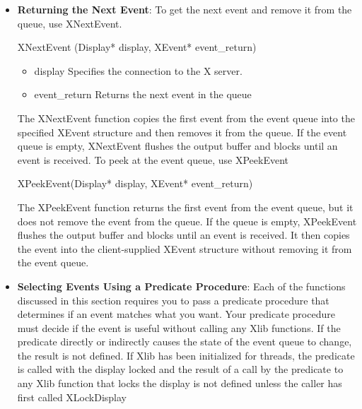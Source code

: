 \documentclass{report}
\begin{document}
\begin{itemize}
\begin{cppcode}
{                    XKeyEvent           xkey;
                    XButtonEvent        xbutton;
                    XMotionEvent        xmotion;
                    XExposeEvent        xexpose;
                    XConfigureEvent     xconfigure;
                    XMapEvent           xmap;
                    XMapRequestEvent    xmaprequest;
                    XDestroyWindowEvent xdestroywindow;

                    /* many more event-specific structures */
                } XEvent;
            \end{cppcode}
        \item \textbf{Returning the Next Event}: To get the next event and remove it from the queue, use XNextEvent.
            \bigbreak \noindent 
            \begin{cppcode}
            XNextEvent (Display* display, XEvent* event_return)
            \end{cppcode}
            \begin{itemize}
                \item display Specifies the connection to the X server.
                \item event\_return Returns the next event in the queue
            \end{itemize}
            The XNextEvent function copies the first event from the event queue into the specified XEvent structure and then removes it from the queue. If the event queue is empty, XNextEvent flushes the output buffer and blocks until an event is received.
            \bigbreak \noindent 
            To peek at the event queue, use XPeekEvent
            \bigbreak \noindent 
            \begin{cppcode}
            XPeekEvent(Display* display, XEvent* event_return)
            \end{cppcode}
            \bigbreak \noindent 
            The XPeekEvent function returns the first event from the event queue, but it does not remove the event from the queue. If the queue is empty, XPeekEvent flushes the output buffer and blocks until an event is received. It then copies the event into the client-supplied XEvent structure without removing it from the event queue.
        \item \textbf{Selecting Events Using a Predicate Procedure}: Each of the functions discussed in this section requires you to pass a predicate procedure that determines if an event matches what you want. Your predicate procedure must decide if the event is useful without calling any Xlib functions. If the predicate directly or indirectly causes the state of the event queue to change, the result is not defined. If Xlib has been initialized for threads, the predicate is called with the display locked and the result of a call by the predicate to any Xlib function that locks the display is not defined unless the caller has first called XLockDisplay

\end{itemize}
\end{document}
